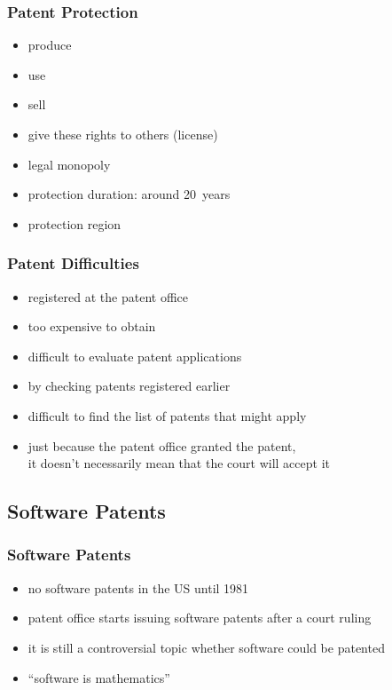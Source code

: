 \documentclass[dvipsnames]{beamer}
\theoremstyle{plain}
\begin{document}
\begin{frame}
  \frametitle{Patent Protection}

  \begin{itemize}
    \item produce
    \item use
    \item sell
    \item give these rights to others (license)
    \item \alert{legal monopoly}

    \pause
    \medskip
    \item protection duration: around 20~years
    \item protection region
  \end{itemize}
\end{frame}

\begin{frame}
  \frametitle{Patent Difficulties}

  \begin{itemize}
    \item registered at the patent office
    \item too expensive to obtain

    \pause
    \medskip
    \item difficult to evaluate patent applications
    \item by checking patents registered earlier

    \pause
    \medskip
    \item difficult to find the list of patents that might apply

    \pause
    \medskip
    \item just because the patent office granted the patent,\\
      it doesn't necessarily mean that the court will accept it
  \end{itemize}
\end{frame}

\subsection{Software Patents}

\begin{frame}
  \frametitle{Software Patents}

  \begin{itemize}
    \item no software patents in the US until 1981
    \item patent office starts issuing software patents
      after a court ruling

    \pause
    \medskip
    \item it is still a controversial topic
      whether software could be patented
    \item ``software is mathematics''
  \end{itemize}
\end{frame}
\end{document}
